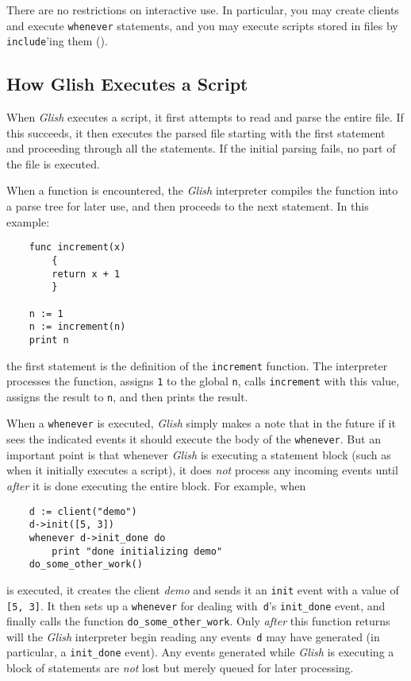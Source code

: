 \begin{sloppy}
There are no restrictions on interactive use.  In particular, you may
create clients and execute {\tt whenever} statements, and you may execute
scripts stored in files by {\tt include}'ing them ().

\subsection{How Glish Executes a Script}
\label{program-execution}

When {\em Glish} executes a script, it first attempts to read and parse the
entire file. If this succeeds, it then executes the parsed file starting
with the first statement and proceeding through all the statements. If
the initial parsing fails, no part of the file is executed.

When a function is encountered, the {\em Glish} interpreter compiles the function
into a parse tree for later use, and then proceeds to the next statement.
In this example:
\begin{verbatim}
    func increment(x)
        {
        return x + 1
        }

    n := 1
    n := increment(n)
    print n
\end{verbatim}
the first statement is the definition of the {\tt increment} function.
The interpreter processes the function, assigns {\tt 1} to
the global {\tt n}, calls {\tt increment} with this value,
assigns the result to {\tt n}, and then prints the result.

When a {\tt whenever} is executed, {\em Glish} simply makes a note that
in the future if it sees the indicated events it should execute
the body of the {\tt whenever}.  But an important point is that
whenever {\em Glish} is executing a statement block (such as when it initially
executes a script), it does {\em not} process any incoming events
until {\em after} it is done executing the entire block.  For example, when
\begin{verbatim}
    d := client("demo")
    d->init([5, 3])
    whenever d->init_done do
        print "done initializing demo"
    do_some_other_work()
\end{verbatim}
is executed, it creates the client {\em demo} and sends it an {\tt init}
event with a value of {\tt [5, 3]}.  It then sets up a {\tt whenever} for
dealing with~{\tt d}'s {\tt init\_done} event, and finally calls
the function {\tt do\_some\_other\_work}.  Only {\em after} this function
returns will the {\em Glish} interpreter begin reading any events~{\tt d}
may have generated (in particular, a {\tt init\_done} event).  Any
events generated while {\em Glish} is executing a block of statements are
{\em not} lost but merely queued for later processing.


\end{sloppy}
